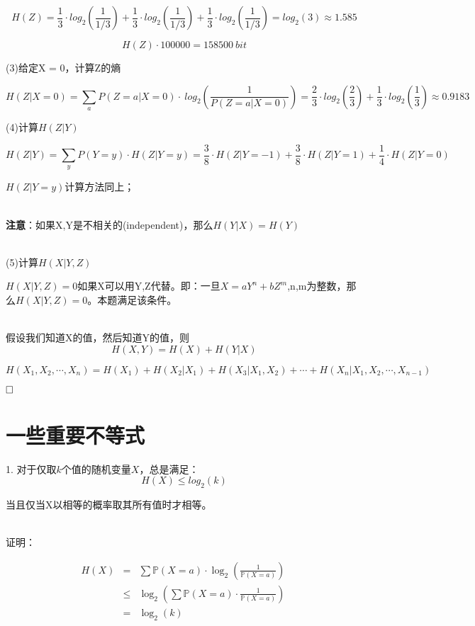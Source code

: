 \documentclass{article}
\begin{document}
$$H(Z) = \frac{1}{3} \cdot log_2(\frac{1}{1/3})+\frac{1}{3} \cdot log_2(\frac{1}{1/3})+\frac{1}{3} \cdot log_2(\frac{1}{1/3})= log_2(3) \approx 1.585$$


$$H(Z) \cdot 100000 =158500 \ bit $$

(3)给定X = 0，计算Z的熵

$$H(Z|X=0)=\sum_a P(Z=a|X=0) \cdot \ log_2(\frac{1}{P(Z=a|X=0)})=\frac{2}{3}\cdot log_2(\frac{2}{3})+\frac{1}{3}\cdot log_2(\frac{1}{3}) \approx 0.9183$$

(4)计算$H(Z|Y)$

$$H(Z|Y) = \sum_y P(Y=y) \cdot H(Z|Y=y)=\frac{3}{8} \cdot H(Z|Y=-1)+\frac{3}{8} \cdot H(Z|Y=1)+\frac{1}{4}\cdot H(Z|Y=0)$$

$H(Z|Y=y)$计算方法同上；

~\\

\textbf{注意}：如果X,Y是不相关的(independent)，那么$H(Y|X)=H(Y)$

~\\

(5)计算$H(X|Y,Z)$

$H(X|Y,Z) = 0$如果X可以用Y,Z代替。即：一旦$X=aY^n+bZ^m$,n,m为整数，那么$H(X|Y,Z) = 0$。本题满足该条件。





~\\

假设我们知道X的值，然后知道Y的值，则
$$H(X,Y) = H(X)+H(Y|X)$$

$$H(X_1,X_2,\cdots,X_n) = H(X_1)+H(X_2|X_1)+H(X_3|X_1,X_2)+\cdots+H(X_n|X_1,X_2,\cdots,X_{n-1})$$

\href{http://www.cs.tau.ac.il/~iftachh/Courses/Info/Fall14/Printouts/Lesson2_h.pdf}{\color{blue}{证明过程请参考这里}}


$\hfill\square$ 


\section*{一些重要不等式}

1. 对于仅取$k$个值的随机变量$X$，总是满足：
$$H(X) \leq log_2(k)$$

当且仅当X以相等的概率取其所有值时才相等。

~\\

证明：


\begin{eqnarray}   
\label{eq}
H(X)&=& \sum \mathbb{P}(X=a) \cdot \log_2(\frac{1}{\mathbb{P}(X=a)}) \nonumber \\ 
&\leq& \log_2 (\sum \mathbb{P}(X=a) \cdot \frac{1}{\mathbb{P}(X=a)}) \ \nonumber \\ 
&=& \log_2(k) \nonumber \\ 
\nonumber 
\end{eqnarray}
\end{document}
